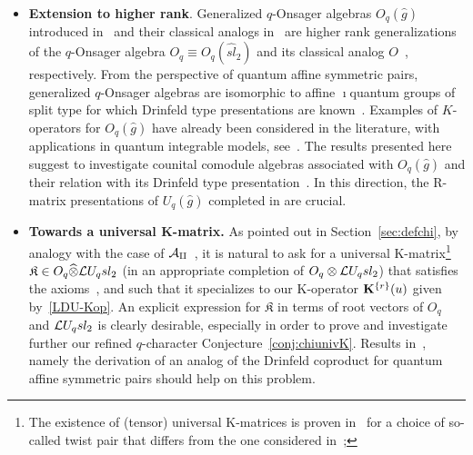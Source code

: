 \documentclass[11pt]{amsart}
\numberwithin{equation}{section}
\numberwithin{equation}{section}
\begin{document}
\begin{itemize}
\item {\bf Extension to higher rank}. Generalized $q$-Onsager algebras  $O_q(\widehat{g})$ introduced in~\cite{BB09} and their classical analogs  in~\cite{UI,S18} are higher rank generalizations of the $q$-Onsager algebra $O_q\equiv O_q(\widehat{sl}_2)$ and its classical analog $O$~\cite{Ons44}, respectively.  From the perspective of quantum affine symmetric pairs, generalized $q$-Onsager algebras are isomorphic to affine $\imath$quantum groups of split type for which Drinfeld type presentations are known~\cite{LW20,Z21}. 
Examples of $K$-operators for $O_q(\widehat{g})$ have already been considered in the literature, with applications in quantum integrable models, see~\cite{BF11,KP,KOY19}. The results presented here suggest to investigate counital comodule algebras associated with $O_q(\widehat{g})$ and their relation with its Drinfeld type presentation~\cite{LW20}. In this direction, the R-matrix presentations of $U_q(\widehat{g})$ completed in \cite{HM97,JLM,JLMBD,LP21} are crucial.

 
\item {\bf Towards a universal K-matrix.} As pointed out in Section~\ref{sec:defchi}, by analogy with the case of $\cal A_q$~\cite{LBG}, it is natural to ask for a universal K-matrix\footnote{The existence of (tensor) universal K-matrices is proven in~\cite{AV24} for a choice of so-called twist pair that differs from the one considered in~\cite{LBG};}   $\mathfrak{K}\in O_q \widehat{\otimes} \mathcal{L} U_q sl_2$ (in an appropriate completion of $O_q \otimes \mathcal{L} U_q sl_2$) that satisfies the axioms~\cite[Def.\,2.7 for $B=O_q$, $H=\Loop$]{LBG}, and such that it specializes to our K-operator $\bold K^{\{r\}}(u)$ given by~\eqref{LDU-Kop}.  An explicit expression for $\mathfrak{K}$ in terms of root vectors of $O_q$ and $\mathcal{L} U_q sl_2$ is clearly desirable, especially in order to  prove and investigate further our refined $q$-character Conjecture~\ref{conj:chiunivK}.
Results in~\cite{LP26}, namely the derivation of an analog of the Drinfeld coproduct for quantum affine symmetric pairs should help on this problem.
\end{itemize}
\end{document}
